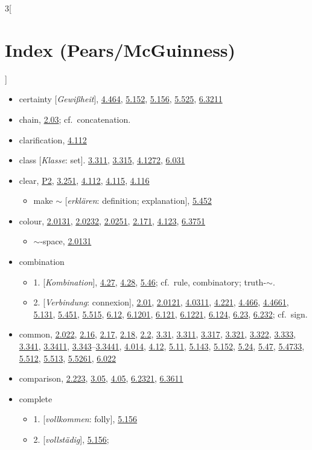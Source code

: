 \documentclass[oneside,openany,12pt]{book}
\newcommand{\indexentry}[1]{\item #1}
\newcommand{\indexsubentry}[1]{\begin{itemize} \item #1 \end{itemize}}
\newcommand{\indexref}[1]{\hyperlink{prop#1}{#1}}
\begin{document}
\begin{multicols}{3}[\section*{Index (Pears/McGuinness)}]
\begin{itemize}
\indexentry{certainty [\textit{Gewi{\ss}heit}], \indexref{4.464}, \indexref{5.152}, \indexref{5.156}, \indexref{5.525}, \indexref{6.3211}}

\indexentry{chain, \indexref{2.03}; cf.\ concatenation.}

\indexentry{clarification, \indexref{4.112}}

\indexentry{class [\textit{Klasse}: set]. \indexref{3.311}, \indexref{3.315}, \indexref{4.1272}, \indexref{6.031}}

\indexentry{clear, \hyperlink{pref2}{P2}, \indexref{3.251}, \indexref{4.112}, \indexref{4.115}, \indexref{4.116}}

   \indexsubentry{make $\sim$ [\textit{erkl{\"a}ren}: definition; explanation], \indexref{5.452}}

\indexentry{colour, \indexref{2.0131}, \indexref{2.0232}, \indexref{2.0251}, \indexref{2.171}, \indexref{4.123}, \indexref{6.3751}}

   \indexsubentry{$\sim$-space, \indexref{2.0131}}

\indexentry{combination}

   \indexsubentry{1. [\textit{Kombination}], \indexref{4.27}, \indexref{4.28}, \indexref{5.46}; cf.\ rule, combinatory; truth-$\sim$.}

   \indexsubentry{2. [\textit{Verbindung}: connexion], \indexref{2.01}, \indexref{2.0121}, \indexref{4.0311}, \indexref{4.221}, \indexref{4.466}, \indexref{4.4661}, \indexref{5.131}, \indexref{5.451}, \indexref{5.515}, \indexref{6.12}, \indexref{6.1201}, \indexref{6.121}, \indexref{6.1221}, \indexref{6.124}, \indexref{6.23}, \indexref{6.232}; cf.\ sign.}

\indexentry{common, \indexref{2.022}, \indexref{2.16}, \indexref{2.17}, \indexref{2.18}, \indexref{2.2}, \indexref{3.31}, \indexref{3.311}, \indexref{3.317}, \indexref{3.321}, \indexref{3.322}, \indexref{3.333}, \indexref{3.341}, \indexref{3.3411}, \indexref{3.343}--\indexref{3.3441}, \indexref{4.014}, \indexref{4.12}, \indexref{5.11}, \indexref{5.143}, \indexref{5.152}, \indexref{5.24}, \indexref{5.47}, \indexref{5.4733}, \indexref{5.512}, \indexref{5.513}, \indexref{5.5261}, \indexref{6.022}}

\indexentry{comparison, \indexref{2.223}, \indexref{3.05}, \indexref{4.05}, \indexref{6.2321}, \indexref{6.3611}}

\indexentry{complete}

   \indexsubentry{1. [\textit{vollkommen}: folly], \indexref{5.156}}

   \indexsubentry{2. [\textit{vollst{\"a}dig}], \indexref{5.156};}


\end{itemize}
\end{multicols}
\end{document}
